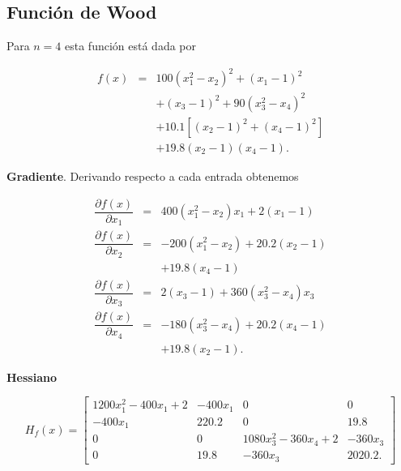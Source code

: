 \documentclass[11pt,letterpaper]{article}
\theoremstyle{definition}
\theoremstyle{definition}
\theoremstyle{definition}
\begin{document}
\subsection{Función de Wood}
Para $ n = 4 $ esta función está dada por
\begin{shaded*}
	\begin{eqnarray*}
		f(x) & = & 100 (x_1^2 - x_2)^2 + (x_1 - 1)^2 \\
			 &   & + (x_3 - 1)^2 + 90 (x_3^2 - x_4)^2 \\
		  	 &   & + 10.1 [ (x_2 -1)^2 + (x_4 -1)^2 ] \\
		  	 &   & + 19.8 (x_2 -1) (x_4 -1).
	\end{eqnarray*}
\end{shaded*}
\textbf{Gradiente}. Derivando respecto a cada entrada obtenemos
\begin{shaded*}
\begin{eqnarray*}
	\dfrac{\partial f(x)}{\partial x_1} & = & 400(x_1^2 - x_2) x_1 + 2(x_1 - 1) \\
	\dfrac{\partial f(x)}{\partial x_2} & = &-200(x_1^2 - x_2) + 20.2 (x_2 - 1) \\
										&   & + 19.8 (x_4 - 1) \\
	\dfrac{\partial f(x)}{\partial x_3} & = & 2(x_3 - 1) + 360 (x_3^2 - x_4) x_3 \\
	\dfrac{\partial f(x)}{\partial x_4} & = & -180 (x_3^2 - x_4)+ 20.2 (x_4 - 1)  \\
										&   & +19.8(x_2 -1).
\end{eqnarray*}
\end{shaded*}
\textbf{Hessiano}
\begin{shaded*}
\tiny{\begin{equation*}
	H_f (x) = \left[\begin{matrix}
					1200 x_1^2 - 400 x_1 + 2 & -400 x_1 & 0 & 0 \\
					-400 x_1                 & 220.2    & 0 & 19.8 \\
					0                        & 0        & 1080x_3^2 - 360x_4 + 2 & -360x_3 \\
					0 & 19.8 & -360 x_3 & 2020.2. 
					 
	\end{matrix}\right]
\end{equation*}}
\end{shaded*}
\end{document}
